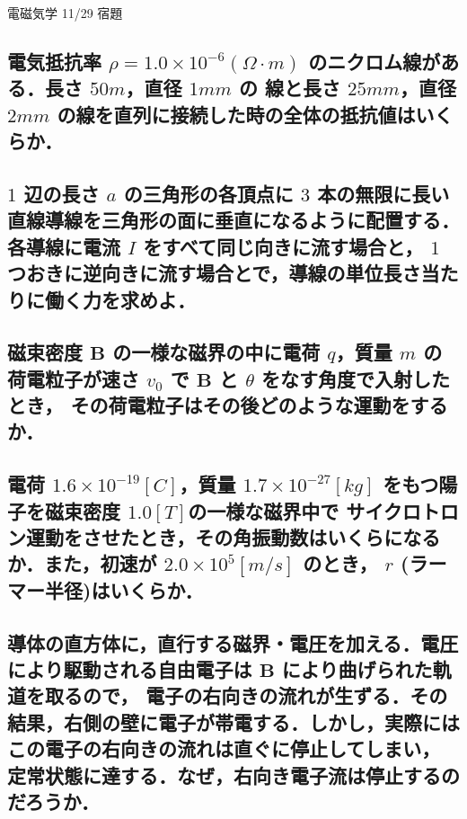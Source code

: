 \documentclass[a4paper, 12pt]{bxjsarticle}
\begin{document}
\begin{center}
    \begin{huge}
        電磁気学 11/29 宿題
    \end{huge}
\end{center}

\subsection{電気抵抗率 \(\rho = 1.0\times10^{-6}\si{(\Omega \cdot m)}\) のニクロム線がある．長さ \(50\si{m}\)，直径 \(1\si{mm}\) の%
線と長さ \(25\si{mm}\)，直径 \(2\si{mm}\) の線を直列に接続した時の全体の抵抗値はいくらか．}
\vspace{20em}

\subsection{\(1\) 辺の長さ \(a\) の三角形の各頂点に \(3\) 本の無限に長い直線導線を三角形の面に垂直になるように配置する．各導線に電流 \(I\) をすべて同じ向きに流す場合と，%
\(1\) つおきに逆向きに流す場合とで，導線の単位長さ当たりに働く力を求めよ．}

\newpage
\subsection{磁束密度 \(\boldsymbol{B}\) の一様な磁界の中に電荷 \(q\)，質量 \(m\) の荷電粒子が速さ \(v_0\) で \(\boldsymbol{B}\) と \(\theta\) をなす角度で入射したとき，%
その荷電粒子はその後どのような運動をするか．}
\vspace{20em}

\subsection{電荷 \(1.6\times10^{-19}\si{[C]}\)，質量 \(1.7\times10^{-27}\si{[kg]}\) をもつ陽子を磁束密度 \(1.0\si{[T]}\)の一様な磁界中で%
サイクロトロン運動をさせたとき，その角振動数はいくらになるか．また，初速が \(2.0\times10^{5}\si{[m/s]}\) のとき，%
\(r\) (ラーマー半径)はいくらか．}
\newpage

\subsection{導体の直方体に，直行する磁界・電圧を加える．電圧により駆動される自由電子は \(\boldsymbol{B}\) により曲げられた軌道を取るので，%
電子の右向きの流れが生ずる．その結果，右側の壁に電子が帯電する．しかし，実際にはこの電子の右向きの流れは直ぐに停止してしまい，%
定常状態に達する．なぜ，右向き電子流は停止するのだろうか．}
\end{document}
